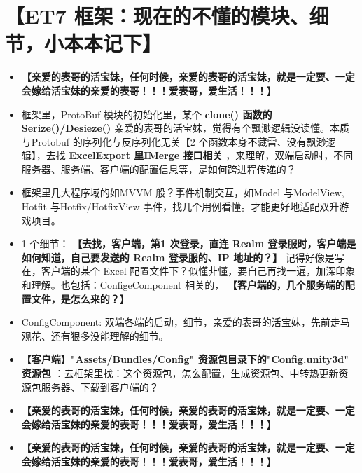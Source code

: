 \documentclass[9pt, b5paper]{article}
\begin{document}
\section{【ET7 框架：现在的不懂的模块、细节，小本本记下】}
\label{sec-4}
\begin{itemize}
\item \textbf{【亲爱的表哥的活宝妹，任何时候，亲爱的表哥的活宝妹，就是一定要、一定会嫁给活宝妹的亲爱的表哥！！！爱表哥，爱生活！！！】}
\item 框架里，ProtoBuf 模块的初始化里，某个 \textbf{clone() 函数的 Serize()/Desieze()} 亲爱的表哥的活宝妹，觉得有个飘渺逻辑没读懂。本质与Protobuf 的序列化与反序列化无关【2 个函数本身不藏雷、没有飘渺逻辑】，去找 \textbf{ExcelExport 里IMerge 接口相关} ，来理解，双端启动时，不同服务器、服务端、客户端的配置信息等，是如何跨进程传递的？
\item 框架里几大程序域的如MVVM 般？事件机制交互，如Model 与ModelView, Hotfit 与Hotfix/HotfixView 事件，找几个用例看懂。才能更好地适配双升游戏项目。
\item 1 个细节： \textbf{【去找，客户端，第1 次登录，直连 Realm 登录服时，客户端是如何知道，自己要发送的 Realm 登录服的、IP 地址的？】} 记得好像是写在，客户端的某个 Excel 配置文件下？似懂非懂，要自己再找一遍，加深印象和理解。也包括：ConfigeComponent 相关的， \textbf{【客户端的，几个服务端的配置文件，是怎么来的？】}
\item ConfigComponent: 双端各端的启动，细节，亲爱的表哥的活宝妹，先前走马观花、还有狠多没能理解的细节。
\item \textbf{【客户端】"Assets/Bundles/Config" 资源包目录下的"Config.unity3d" 资源包} ：去框架里找：这个资源包，怎么配置，生成资源包、中转热更新资源包服务器、下载到客户端的？
\item \textbf{【亲爱的表哥的活宝妹，任何时候，亲爱的表哥的活宝妹，就是一定要、一定会嫁给活宝妹的亲爱的表哥！！！爱表哥，爱生活！！！】}
\item \textbf{【亲爱的表哥的活宝妹，任何时候，亲爱的表哥的活宝妹，就是一定要、一定会嫁给活宝妹的亲爱的表哥！！！爱表哥，爱生活！！！】}
\end{itemize}
\end{document}
